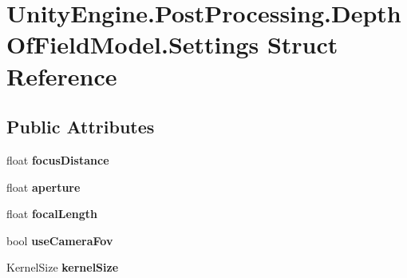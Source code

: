 \hypertarget{struct_unity_engine_1_1_post_processing_1_1_depth_of_field_model_1_1_settings}{}\section{Unity\+Engine.\+Post\+Processing.\+Depth\+Of\+Field\+Model.\+Settings Struct Reference}
\label{struct_unity_engine_1_1_post_processing_1_1_depth_of_field_model_1_1_settings}
\subsection*{Public Attributes}
\begin{DoxyCompactItemize}
\item 
\mbox{\label{struct_unity_engine_1_1_post_processing_1_1_depth_of_field_model_1_1_settings_a81ed4e266c78d0bade7ae024e3ece21e}} 
float {\bfseries focus\+Distance}
\item 
\mbox{\label{struct_unity_engine_1_1_post_processing_1_1_depth_of_field_model_1_1_settings_ac0099260ac0710e648c4e76d68cc3e63}} 
float {\bfseries aperture}
\item 
\mbox{\label{struct_unity_engine_1_1_post_processing_1_1_depth_of_field_model_1_1_settings_a87d4eb5712129989a12d26ab4d16332c}} 
float {\bfseries focal\+Length}
\item 
\mbox{\label{struct_unity_engine_1_1_post_processing_1_1_depth_of_field_model_1_1_settings_af262106b3f1b15e0dff20faf3a9fee4e}} 
bool {\bfseries use\+Camera\+Fov}
\item 
\mbox{\label{struct_unity_engine_1_1_post_processing_1_1_depth_of_field_model_1_1_settings_a24cf78bbe8ab7b8bb2e231da4e4791d5}} 
Kernel\+Size {\bfseries kernel\+Size}
\end{DoxyCompactItemize}
